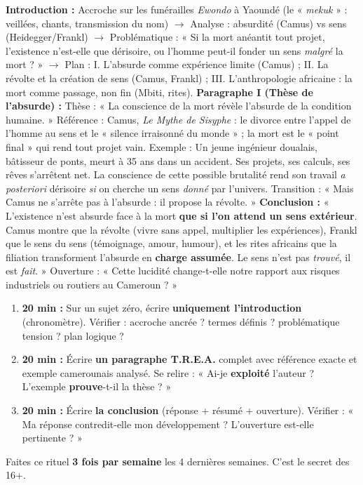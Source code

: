 \documentclass[11pt]{article}
\newcommand{\cle}[1]{{\popxbold\color{popdark}#1}}
\begin{document}
\begin{corrige}
\textbf{Introduction :} Accroche sur les funérailles \emph{Ewondo} à Yaoundé (le « \emph{mekuk} » : veillées, chants, transmission du nom) $\rightarrow$ Analyse : absurdité (Camus) vs sens (Heidegger/Frankl) $\rightarrow$ Problématique : « Si la mort anéantit tout projet, l'existence n'est-elle que dérisoire, ou l'homme peut-il fonder un sens \emph{malgré} la mort ? » $\rightarrow$ Plan : I. L'absurde comme expérience limite (Camus) ; II. La révolte et la création de sens (Camus, Frankl) ; III. L'anthropologie africaine : la mort comme passage, non fin (Mbiti, rites).
\textbf{Paragraphe I (Thèse de l'absurde) :} Thèse : « La conscience de la mort révèle l'absurde de la condition humaine. » Référence : Camus, \emph{Le Mythe de Sisyphe} : le divorce entre l'appel de l'homme au sens et le « silence irraisonné du monde » ; la mort est le « point final » qui rend tout projet vain. Exemple : Un jeune ingénieur doualais, bâtisseur de ponts, meurt à 35 ans dans un accident. Ses projets, ses calculs, ses rêves s'arrêtent net. La conscience de cette possible brutalité rend son travail \emph{a posteriori} dérisoire \emph{si} on cherche un sens \emph{donné} par l'univers. Transition : « Mais Camus ne s'arrête pas à l'absurde : il propose la révolte. »
\textbf{Conclusion :} « L'existence n'est absurde face à la mort \textbf{que si l'on attend un sens extérieur}. Camus montre que la \cle{révolte} (vivre sans appel, multiplier les expériences), Frankl que le \cle{sens du sens} (témoignage, amour, humour), et les rites africains que la \cle{filiation} transforment l'absurde en \textbf{charge assumée}. Le sens n'est pas \emph{trouvé}, il est \emph{fait}. » Ouverture : « Cette lucidité change-t-elle notre rapport aux risques industriels ou routiers au Cameroun ? »
\end{corrige}

\begin{methode}
\begin{enumerate}
    \item \textbf{20 min :} Sur un sujet zéro, écrire \textbf{uniquement l'introduction} (chronomètre). Vérifier : accroche ancrée ? termes définis ? problématique tension ? plan logique ?
    \item \textbf{20 min :} Écrire \textbf{un paragraphe T.R.E.A.} complet avec référence exacte et exemple camerounais analysé. Se relire : « Ai-je \textbf{exploité} l'auteur ? L'exemple \textbf{prouve}-t-il la thèse ? »
    \item \textbf{20 min :} Écrire \textbf{la conclusion} (réponse + résumé + ouverture). Vérifier : « Ma réponse contredit-elle mon développement ? L'ouverture est-elle pertinente ? »
\end{enumerate}
Faites ce rituel \textbf{3 fois par semaine} les 4 dernières semaines. C'est le secret des 16+.
\end{methode}
\end{document}
